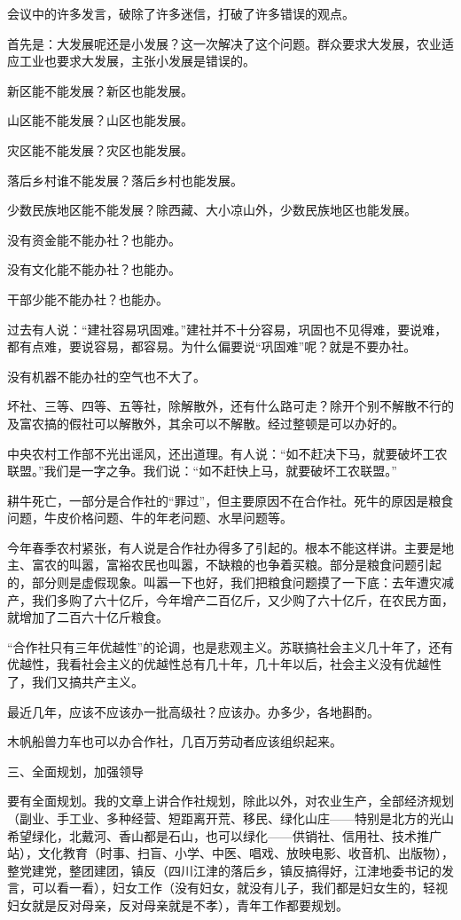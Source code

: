 会议中的许多发言，破除了许多迷信，打破了许多错误的观点。

首先是：大发展呢还是小发展？这一次解决了这个问题。群众要求大发展，农业适应工业也要求大发展，主张小发展是错误的。

新区能不能发展？新区也能发展。

山区能不能发展？山区也能发展。

灾区能不能发展？灾区也能发展。

落后乡村谁不能发展？落后乡村也能发展。

少数民族地区能不能发展？除西藏、大小凉山外，少数民族地区也能发展。

没有资金能不能办社？也能办。

没有文化能不能办社？也能办。

干部少能不能办社？也能办。

过去有人说：“建社容易巩固难。”建社并不十分容易，巩固也不见得难，要说难，都有点难，要说容易，都容易。为什么偏要说“巩固难”呢？就是不要办社。

没有机器不能办社的空气也不大了。

坏社、三等、四等、五等社，除解散外，还有什么路可走？除开个别不解散不行的及富农搞的假社可以解散外，其余可以不解散。经过整顿是可以办好的。

中央农村工作部不光出谣风，还出道理。有人说：“如不赶决下马，就要破坏工农联盟。”我们是一字之争。我们说：“如不赶快上马，就要破坏工农联盟。”

耕牛死亡，一部分是合作社的“罪过”，但主要原因不在合作社。死牛的原因是粮食问题，牛皮价格问题、牛的年老问题、水旱问题等。

今年春季农村紧张，有人说是合作社办得多了引起的。根本不能这样讲。主要是地主、富农的叫嚣，富裕农民也叫嚣，不缺粮的也争着买粮。部分是粮食问题引起的，部分则是虚假现象。叫嚣一下也好，我们把粮食问题摸了一下底：去年遭灾减产，我们多购了六十亿斤，今年增产二百亿斤，又少购了六十亿斤，在农民方面，就增加了二百六十亿斤粮食。

“合作社只有三年优越性”的论调，也是悲观主义。苏联搞社会主义几十年了，还有优越性，我看社会主义的优越性总有几十年，几十年以后，社会主义没有优越性了，我们又搞共产主义。

最近几年，应该不应该办一批高级社？应该办。办多少，各地斟酌。

木帆船兽力车也可以办合作社，几百万劳动者应该组织起来。

三、全面规划，加强领导

要有全面规划。我的文章上讲合作社规划，除此以外，对农业生产，全部经济规划（副业、手工业、多种经营、短距离开荒、移民、绿化山庄——特别是北方的光山希望绿化，北戴河、香山都是石山，也可以绿化——供销社、信用社、技术推广站），文化教育（时事、扫盲、小学、中医、唱戏、放映电影、收音机、出版物），整党建党，整团建团，镇反（四川江津的落后乡，镇反搞得好，江津地委书记的发言，可以看一看），妇女工作（没有妇女，就没有儿子，我们都是妇女生的，轻视妇女就是反对母亲，反对母亲就是不孝），青年工作都要规划。

